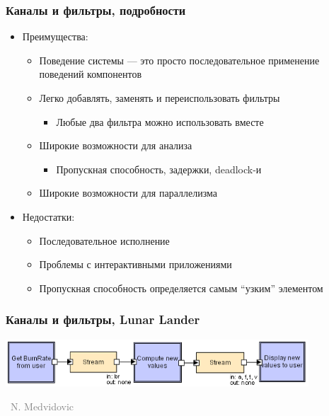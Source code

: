 \documentclass[xetex,mathserif,serif]{beamer}
\newcommand{\attribution}[1] {
    \vspace{-5mm}\begin{flushright}\begin{scriptsize}\textcolor{gray}{\textcopyright\, #1}\end{scriptsize}\end{flushright}
}
\begin{document}
    \begin{frame}
        \frametitle{Каналы и фильтры, подробности}
        \begin{itemize}
            \item Преимущества:
            \begin{itemize}
                \item Поведение системы --- это просто последовательное применение поведений компонентов
                \item Легко добавлять, заменять и переиспользовать фильтры
                \begin{itemize}
                    \item Любые два фильтра можно использовать вместе
                \end{itemize}
                \item Широкие возможности для анализа
                \begin{itemize}
                    \item Пропускная способность, задержки, deadlock-и
                \end{itemize}
                \item Широкие возможности для параллелизма
            \end{itemize}
            \item Недостатки:
            \begin{itemize}
                \item Последовательное исполнение
                \item Проблемы с интерактивными приложениями
                \item Пропускная способность определяется самым ``узким'' элементом
            \end{itemize}
        \end{itemize}
    \end{frame}

    \begin{frame}
        \frametitle{Каналы и фильтры, Lunar Lander}
        \begin{center}
            \includegraphics[width=0.85\textwidth]{pipesAndFiltersLL.png}
            \attribution{N. Medvidovic}
        \end{center}
    \end{frame}
\end{document}
